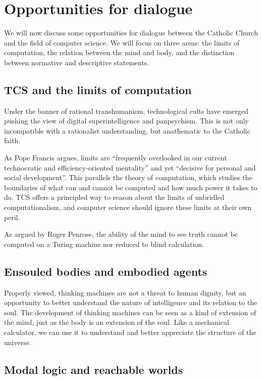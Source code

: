 \documentclass[sigplan,nonacm]{acmart}\settopmatter{printfolios=false,printccs=false,printacmref=false}
\begin{document}
  \section{Opportunities for dialogue}

  We will now discuss some opportunities for dialogue between the Catholic Church and the field of computer science. We will focus on three areas: the limits of computation, the relation between the mind and body, and the distinction between normative and descriptive statements.

  \subsection{TCS and the limits of computation}

  Under the banner of rational transhumanism, technological cults have emerged pushing the view of digital superintelligence and panpsychism. This is not only incompatible with a rationalist understanding, but anathematic to the Catholic faith.

  As Pope Francis argues, limits are ``frequently overlooked in our current technocratic and efficiency-oriented mentality'' and yet ``decisive for personal and social development''. This parallels the theory of computation, which studies the boundaries of what can and cannot be computed and how much power it takes to do. TCS offers a principled way to reason about the limits of unbridled computationalism, and computer science should ignore these limits at their own peril.

  As argued by Roger Penrose, the ability of the mind to see truth cannot be computed on a Turing machine nor reduced to blind calculation.

  \subsection{Ensouled bodies and embodied agents}

  Properly viewed, thinking machines are not a threat to human dignity, but an opportunity to better understand the nature of intelligence and its relation to the soul. The development of thinking machines can be seen as a kind of extension of the mind, just as the body is an extension of the soul. Like a mechanical calculator, we can use it to understand and better appreciate the structure of the universe.

  \subsection{Modal logic and reachable worlds}
\end{document}
